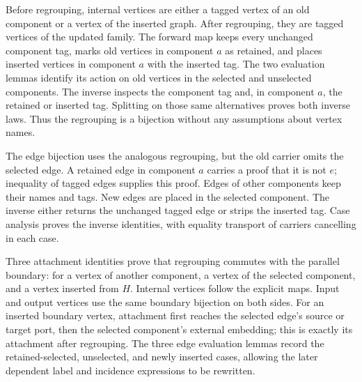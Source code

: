 Before regrouping, internal vertices are either a tagged vertex of an old
component or a vertex of the inserted graph. After regrouping, they are tagged
vertices of the updated family. The forward map keeps every unchanged component
tag, marks old vertices in component $a$ as retained, and places inserted
vertices in component $a$ with the inserted tag. The two evaluation lemmas
identify its action on old vertices in the selected and unselected components.
The inverse inspects the component tag and, in component $a$, the retained or
inserted tag. Splitting on those same alternatives proves both inverse laws.
Thus the regrouping is a bijection without any assumptions about vertex names.







The edge bijection uses the analogous regrouping, but the old carrier omits
the selected edge. A retained edge in component $a$ carries a proof that it is
not $e$; inequality of tagged edges supplies this proof. Edges of other
components keep their names and tags. New edges are placed in the selected
component. The inverse either returns the unchanged tagged edge or strips the
inserted tag. Case analysis proves the inverse identities, with equality
transport of carriers cancelling in each case.





Three attachment identities prove that regrouping commutes with the parallel
boundary: for a vertex of another component, a vertex of the selected component,
and a vertex inserted from $H$. Internal vertices follow the explicit maps.
Input and output vertices use the same boundary bijection on both sides.
For an inserted boundary vertex, attachment first reaches the selected edge's
source or target port, then the selected component's external embedding; this
is exactly its attachment after regrouping. The three edge evaluation lemmas
record the retained-selected, unselected, and newly inserted cases, allowing
the later dependent label and incidence expressions to be rewritten.


